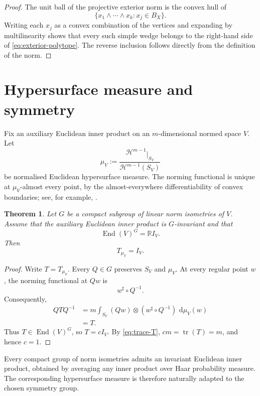 \documentclass[11pt,a4paper]{amsart}
\numberwithin{equation}{section}
\theoremstyle{plain}
\newtheorem{theorem}{Theorem}[section]
\theoremstyle{definition}
\theoremstyle{remark}
\DeclareMathOperator{\End}{End}
\DeclareMathOperator{\tr}{tr}
\newcommand{\R}{\mathbb{R}}
\newcommand{\dd}{\,\mathrm{d}}
\newcommand{\Id}{I}
\newcommand{\restr}{\mathbin{|}}
\begin{document}
\begin{proof}
The unit ball of the projective exterior norm is the convex hull of
\[
\{x_1\wedge\cdots\wedge x_k:x_j\in B_X\}.
\]
Writing each $x_j$ as a convex combination of the vertices and expanding by multilinearity shows that every such simple wedge belongs to the right-hand side of \eqref{eq:exterior-polytope}. The reverse inclusion follows directly from the definition of the norm.
\end{proof}

\section{Hypersurface measure and symmetry}\label{sec:symmetry}

Fix an auxiliary Euclidean inner product on an $m$-dimensional normed space $V$. Let
\begin{equation}\label{eq:surface-measure}
\mu_V:=\frac{\mathcal H^{m-1}\restr_{S_V}}{\mathcal H^{m-1}(S_V)}
\end{equation}
be normalised Euclidean hypersurface measure. The norming functional is unique at $\mu_V$-almost every point, by the almost-everywhere differentiability of convex boundaries; see, for example, \cite[Chapter~5]{EvansGariepy}.

\begin{theorem}\label{thm:symmetry}
Let $G$ be a compact subgroup of linear norm isometries of $V$. Assume that the auxiliary Euclidean inner product is $G$-invariant and that
\[
\End(V)^G=\R\Id_V.
\]
Then
\[
T_{\mu_V}=\Id_V.
\]
\end{theorem}

\begin{proof}
Write $T=T_{\mu_V}$. Every $Q\in G$ preserves $S_V$ and $\mu_V$. At every regular point $w$, the norming functional at $Qw$ is
\[
w^\sharp\circ Q^{-1}.
\]
Consequently,
\begin{align*}
QTQ^{-1}
&=m\int_{S_V}(Qw)\otimes(w^\sharp\circ Q^{-1})\,\dd\mu_V(w)\\
&=T.
\end{align*}
Thus $T\in\End(V)^G$, so $T=c\Id_V$. By \eqref{eq:trace-T}, $cm=\tr(T)=m$, and hence $c=1$.
\end{proof}

Every compact group of norm isometries admits an invariant Euclidean inner product, obtained by averaging any inner product over Haar probability measure. The corresponding hypersurface measure is therefore naturally adapted to the chosen symmetry group.
\end{document}
